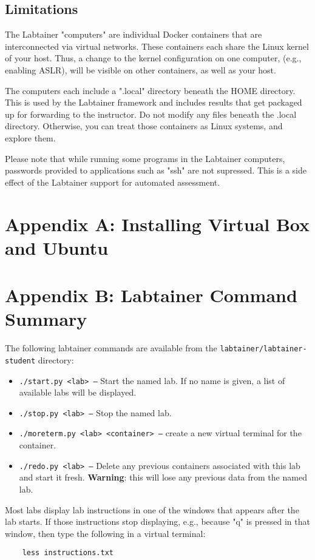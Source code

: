 \documentclass[12pt]{article}
\begin{document}
\subsection{Limitations}
The Labtainer "computers" are individual Docker containers that are interconnected via virtual
networks.  These containers each share the Linux kernel of your host.  Thus, a change
to the kernel configuration on one computer, (e.g., enabling ASLR), will be visible on
other containers, as well as your host.

The computers each include a ".local" directory beneath the HOME directory.  This is used
by the Labtainer framework and includes results that get packaged up for forwarding to the
instructor.  Do not modify any files beneath the .local directory.  Otherwise, you can treat
those containers as Linux systems, and explore them.

Please note that while running some programs in the Labtainer computers, passwords provided to
applications such as "ssh" are not supressed.  This is a side effect of the Labtainer
support for automated assessment.  


\appendix 
\section {Appendix A: Installing Virtual Box and Ubuntu}

\appendix 
\section {Appendix B: Labtainer Command Summary}
\label{sec:appendixB}
The following labtainer commands are available from the \texttt{labtainer/labtainer-student}
directory:
\begin{itemize}
\item \texttt{./start.py <lab> --}
Start the named lab.  If no name is given, a list of available labs will be displayed.
\item \texttt{./stop.py <lab> --} Stop the named lab.
\item \texttt{./moreterm.py <lab> <container> --} create a new virtual terminal for the container.
\item \texttt{./redo.py <lab> --}
Delete any previous containers associated with this lab and start it fresh.  \textbf{Warning}: this will lose any
previous data from the named lab.
\end{itemize}

Most labs display lab instructions in one of the windows that appears after the lab starts.  If those instructions
stop displaying, e.g., because "q" is pressed in that window, then type the following in a virtual terminal:
\begin{verbatim}
    less instructions.txt
\end{verbatim}
\end{document}
